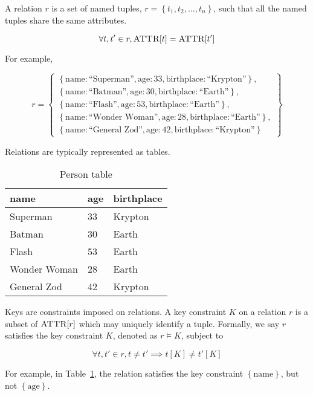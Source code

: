 	\begin{defn}[Relation]
	\label{def:relation}
		A relation $r$ is a set of named tuples, $r = \left\{t_1, t_2, \dotsc, t_n\right\}$, such that all the named tuples share the same attributes.
		
		$$\forall t, t' \in r, \textsc{ATTR}\lbrack t\rbrack = \textsc{ATTR}\lbrack t'\rbrack$$
		
		For example,
		
		$$r = \left\{
			\begin{array}{l}
				\left\{\mathrm{name}: \textrm{``Superman''}, \mathrm{age}: 33, \mathrm{birthplace}: \textrm{``Krypton''}\right\}, \\
				\left\{\mathrm{name}: \textrm{``Batman''}, \mathrm{age}: 30, \mathrm{birthplace}: \textrm{``Earth''}\right\}, \\
				\left\{\mathrm{name}: \textrm{``Flash''}, \mathrm{age}: 53, \mathrm{birthplace}: \textrm{``Earth''}\right\}, \\
				\left\{\mathrm{name}: \textrm{``Wonder Woman''}, \mathrm{age}: 28, \mathrm{birthplace}: \textrm{``Earth''}\right\}, \\
				\left\{\mathrm{name}: \textrm{``General Zod''}, \mathrm{age}: 42, \mathrm{birthplace}: \textrm{``Krypton''}\right\}
			\end{array}
		\right\}$$
		
		Relations are typically represented as tables.
		
		\begin{table}[!ht]
			\centering
			\begin{tabular}{lll}
				\toprule
				name & age & birthplace \\
				\midrule
				Superman & 33 & Krypton \\
				Batman & 30 & Earth \\
				Flash & 53 & Earth \\
				Wonder Woman & 28 & Earth \\
				General Zod & 42 & Krypton \\
				\bottomrule
			\end{tabular}
			
			\caption{Person table}
			\label{tbl:person}
		\end{table}
	\end{defn}
	
	\begin{defn}[Keys]
	\label{def:keys}
		Keys are constraints imposed on relations.  A key constraint $K$ on a relation $r$ is a subset of $\textsc{ATTR}\lbrack r\rbrack$ which may uniquely identify a tuple.  Formally, we say $r$ satisfies the key constraint $K$, denoted as $r \models K$, subject to
		
		$$\forall t, t' \in r, t \not= t' \implies t[K] \not= t'[K]$$
		
		For example, in Table~\ref{tbl:person}, the relation satisfies the key constraint $\left\{\mathrm{name}\right\}$, but not $\left\{\mathrm{age}\right\}$.
	\end{defn}
	

